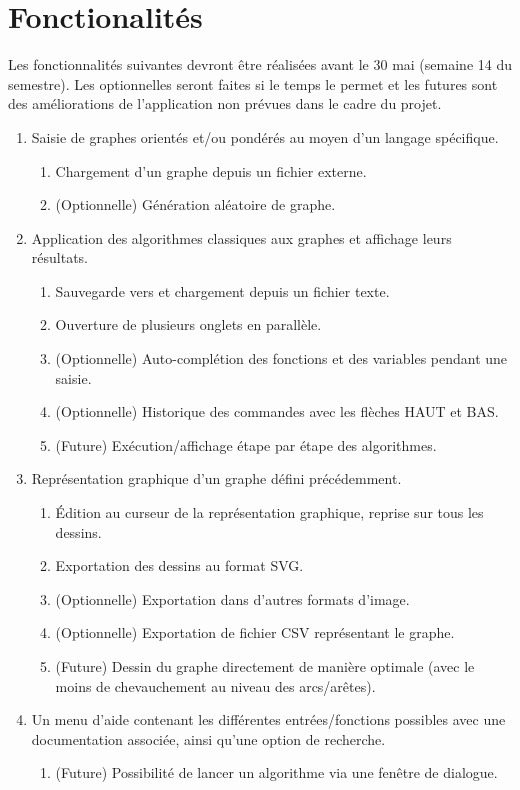 \documentclass[french]{article}
\begin{document}
	\section{Fonctionalités}
		Les fonctionnalités suivantes devront être réalisées avant le 30 mai (semaine 14 du semestre). Les optionnelles seront faites si le temps le permet et les futures sont des améliorations de l'application non prévues dans le cadre du projet.
		\begin{enumerate}
			\item Saisie de graphes orientés et/ou pondérés au moyen d'un langage spécifique.
			\begin{enumerate}
				\item Chargement d'un graphe depuis un fichier externe.
				\item (Optionnelle) Génération aléatoire de graphe.
			\end{enumerate}
			
			\item Application des algorithmes classiques aux graphes et affichage leurs résultats.
			\begin{enumerate}
				\item Sauvegarde vers et chargement depuis un fichier texte.
				\item Ouverture de plusieurs onglets en parallèle.
				\item (Optionnelle) Auto-complétion des fonctions et des variables pendant une saisie.
				\item (Optionnelle) Historique des commandes avec les flèches HAUT et BAS.
				\item (Future) Exécution/affichage étape par étape des algorithmes.
			\end{enumerate}
			
			\item Représentation graphique d'un graphe défini précédemment.
			\begin{enumerate}
				\item Édition au curseur de la représentation graphique, reprise sur tous les dessins.
				\item Exportation des dessins au format SVG.
				\item (Optionnelle) Exportation dans d'autres formats d'image.
				\item (Optionnelle) Exportation de fichier CSV représentant le graphe.
				\item (Future) Dessin du graphe directement de manière optimale (avec le moins de chevauchement au niveau des arcs/arêtes).
			\end{enumerate}
			
			\item Un menu d'aide contenant les différentes entrées/fonctions possibles avec une documentation associée, ainsi qu'une option de recherche.
			\begin{enumerate}
				\item (Future) Possibilité de lancer un algorithme via une fenêtre de dialogue.
			\end{enumerate}
		\end{enumerate}
		
\end{document}
